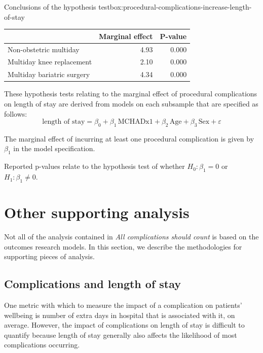\documentclass[submission]{grattan}
\newcommand*{\myTitle}{All complications should count}
\begin{document}
\begin{smallbox}{Conclusions of the hypothesis test}{box:procedural-complications-increase-length-of-stay}
\null\vspace{0.5\baselineskip}

\label{tbl:procedural-complications-increase-length-of-stay}
\begin{tabularx}{\linewidth}{lRR}
\toprule
& \textbf{Marginal effect} & \textbf{P-value}\tabularnewline
\midrule
Non-obstetric multiday & 4.93 & 0.000\tabularnewline
Multiday knee replacement & 2.10 & 0.000\tabularnewline
Multiday bariatric surgery & 4.34 & 0.000\tabularnewline
\bottomrule
\end{tabularx}
\vspace{0.5\baselineskip}

These hypothesis tests relating to the marginal effect of procedural complications on length of stay are derived from models on each subsample that are specified as follows:
\[\text{length of stay} =  \beta_{0} + \beta_{1}\,\mathrm{MCHADx1} + \beta_{2}\,\text{Age} + \beta_{3}\,\text{Sex} + \varepsilon\]

The marginal effect of incurring at least one procedural complication is given by \(\beta_{1}\) in the model specification.

Reported p-values relate to the hypothesis test of whether \(H_{0}:\beta_{1} = 0\) or \(H_{1}:\beta_{1} \neq 0\).
\end{smallbox}

\section{Other supporting analysis}\label{sec:other-supporting-analysis}

Not all of the analysis contained in \textit{\myTitle} is based on the outcomes research models.
In this section, we describe the methodologies for supporting pieces of analysis.

\subsection{Complications and length of stay}\label{subsec:complications-and-length-of-stay}

One metric with which to measure the impact of a complication on patients' wellbeing is number of extra days in hospital that is associated with it, on average.
However, the impact of complications on length of stay is difficult to quantify because length of stay generally also affects the likelihood of most complications occurring.%
\end{document}
